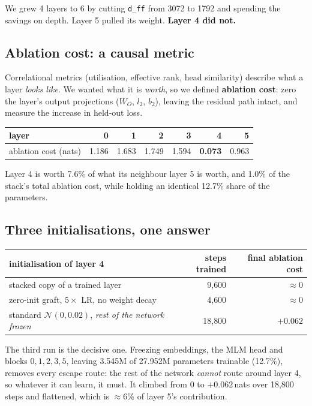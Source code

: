 \documentclass[11pt,a4paper]{article}
\newcommand{\dff}{\texttt{d\_ff}}
\newcommand{\WO}{\ensuremath{W_O}}
\newcommand{\nats}[1]{\ensuremath{#1}\,nats}
\begin{document}
We grew 4 layers to 6 by cutting \dff{} from 3072 to 1792 and spending the savings on depth.
Layer 5 pulled its weight. \textbf{Layer 4 did not.}

\subsection{Ablation cost: a causal metric}

Correlational metrics (utilisation, effective rank, head similarity) describe what a layer
\emph{looks like}. We wanted what it is \emph{worth}, so we defined \textbf{ablation cost}: zero
the layer's output projections ($\WO$, $l_2$, $b_2$), leaving the residual path intact, and
measure the increase in held-out loss.

\begin{center}\small
\begin{tabular}{lrrrrrr}
\toprule
layer & 0 & 1 & 2 & 3 & \textbf{4} & 5 \\
\midrule
ablation cost (nats) & 1.186 & 1.683 & 1.749 & 1.594 & \textbf{0.073} & 0.963 \\
\bottomrule
\end{tabular}
\end{center}

Layer 4 is worth 7.6\% of what its neighbour layer 5 is worth, and 1.0\% of the stack's total
ablation cost, while holding an identical 12.7\% share of the parameters.

\subsection{Three initialisations, one answer}

\begin{center}\small
\begin{tabular}{lrr}
\toprule
initialisation of layer 4 & steps trained & final ablation cost \\
\midrule
stacked copy of a trained layer                     & 9{,}600  & $\approx 0$ \\
zero-init graft, $5\times$ LR, no weight decay      & 4{,}600  & $\approx 0$ \\
standard $\mathcal{N}(0,0.02)$, \emph{rest of the network frozen} & 18{,}800 & $\mathbf{+0.062}$ \\
\bottomrule
\end{tabular}
\end{center}

The third run is the decisive one. Freezing embeddings, the MLM head and blocks
$0,1,2,3,5$, leaving 3.545M of 27.952M parameters trainable (12.7\%), removes every escape
route: the rest of the network \emph{cannot} route around layer 4, so whatever it can learn, it
must. It climbed from 0 to \nats{{+}0.062} over 18{,}800 steps and flattened, which is
$\approx$6\% of layer 5's contribution.
\end{document}
